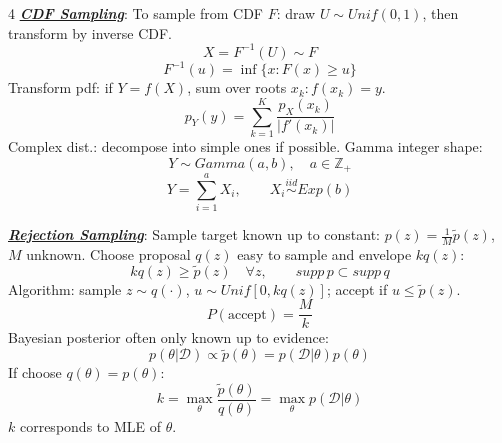 \documentclass[12pt]{article}
\newcommand{\bulletPoint}[1]{\ul{\textit{\textbf{#1}}}}
\begin{document}
\begin{multicols*}{4}
\bulletPoint{CDF Sampling}:
To sample from CDF $F$: draw $U\sim Unif(0,1)$, then transform by inverse CDF.
\useshortskip \begin{equation*}
    X=F^{-1}(U)\sim F
\end{equation*}
\useshortskip \begin{equation*}
    F^{-1}(u)=\inf\{x:F(x)\ge u\}
\end{equation*}
Transform pdf: if $Y=f(X)$, sum over roots $x_k:f(x_k)=y$.
\useshortskip \begin{equation*}
    p_Y(y)=\sum_{k=1}^K \frac{p_X(x_k)}{|f'(x_k)|}
\end{equation*}
Complex dist.: decompose into simple ones if possible.
Gamma integer shape:
\useshortskip \begin{equation*}
    Y\sim Gamma(a,b),\quad a\in\mathbb{Z}_+
\end{equation*}
\useshortskip \begin{equation*}
    Y=\sum_{i=1}^a X_i,\qquad X_i\overset{iid}{\sim}Exp(b)
\end{equation*}

\bulletPoint{Rejection Sampling}:
Sample target known up to constant: $p(z)=\frac{1}{M}\tilde{p}(z)$, $M$ unknown.
Choose proposal $q(z)$ easy to sample and envelope $kq(z)$:
\useshortskip \begin{equation*}
    kq(z)\ge \tilde{p}(z)\quad \forall z,\qquad supp\,p\subset supp\,q
\end{equation*}
Algorithm: sample $z\sim q(\cdot)$, $u\sim Unif[0,kq(z)]$; accept if $u\le\tilde{p}(z)$.
\useshortskip \begin{equation*}
    P(\text{accept})=\frac{M}{k}
\end{equation*}
Bayesian posterior often only known up to evidence:
\useshortskip \begin{equation*}
    p(\theta|\mathcal{D})\propto \tilde{p}(\theta)=p(\mathcal{D}|\theta)p(\theta)
\end{equation*}
If choose $q(\theta)=p(\theta)$:
\useshortskip \begin{equation*}
    k=\max_\theta \frac{\tilde{p}(\theta)}{q(\theta)}
    =\max_\theta p(\mathcal{D}|\theta)
\end{equation*}
$k$ corresponds to MLE of $\theta$.


\end{multicols*}
\end{document}
